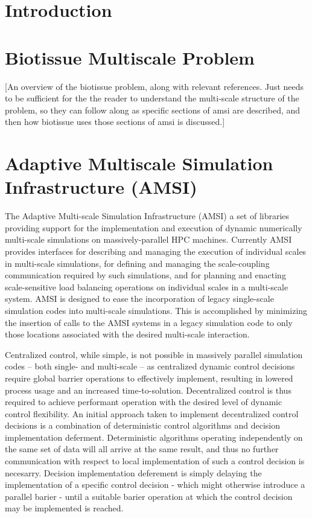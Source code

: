 \documentclass[11pt]{article}
\begin{document}
\maketitle

\begin{abstract}
\end{abstract}

\section{Introduction}\label{introduction}

\section{Biotissue Multiscale Problem}\label{biotissue}
[An overview of the biotissue problem, along with relevant references. Just needs to be sufficient for the the reader to understand the multi-scale structure of the problem, so they can follow along as specific sections of amsi are described, and then how biotissue uses those sections of amsi is discussed.]

\section{Adaptive Multiscale Simulation Infrastructure (AMSI)}\label{amsi}
The Adaptive Multi-scale Simulation Infrastructure (AMSI) a set of libraries providing support for the implementation and execution of dynamic numerically multi-scale simulations on massively-parallel HPC machines. Currently AMSI provides interfaces for describing and managing the execution of individual scales in multi-scale simulations, for defining and managing the scale-coupling communication required by such simulations, and for planning and enacting scale-sensitive load balancing operations on individual scales in a multi-scale system. AMSI is designed to ease the incorporation of legacy single-scale simulation codes into multi-scale simulations. This is accomplished by minimizing the insertion of calls to the AMSI systems in a legacy simulation code to only those locations associated with the desired multi-scale interaction. 

Centralized control, while simple, is not possible in massively parallel simulation codes -- both single- and multi-scale -- as centralized dynamic control decisions require global barrier operations to effectively implement, resulting in lowered process usage and an increased time-to-solution. Decentralized control is thus required to achieve performant operation with the desired level of dynamic control flexibility. An initial approach taken to implement decentralized control decisions is a combination of deterministic control algorithms and decision implementation deferment. Deterministic algorithms operating independently on the same set of data will all arrive at the same result, and thus no further communication with respect to local implementation of such a control decision is necesarry. Decision implementation deferement is simply delaying the implementation of a specific control decision - which might otherwise introduce a parallel barier - until a suitable barier operation at which the control decision may be implemented is reached.
\end{document}
